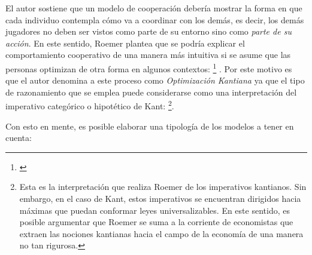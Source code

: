 El autor sostiene que un modelo de cooperación debería mostrar la forma en que cada individuo contempla cómo va a coordinar con los demás, es decir, los demás jugadores no deben ser vistos como parte de su entorno sino como \textit{parte de su acción}. En este sentido, Roemer plantea que se podría explicar el comportamiento cooperativo de una manera más intuitiva si se asume que las personas optimizan de otra forma en algunos contextos: \footnote{ \citep[p. viii]{Roemer_2019}} \citep[p. viii]{Roemer_2019}. Por este motivo es que el autor denomina a este proceso como \textit{Optimización Kantiana} ya que el tipo de razonamiento que se emplea puede considerarse como una interpretación del imperativo categórico o hipotético de Kant: \footnote{Esta es la interpretación que realiza Roemer de los imperativos kantianos. Sin embargo, en el caso de Kant, estos imperativos se encuentran dirigidos hacia máximas que puedan conformar leyes universalizables. En este sentido, es posible argumentar que Roemer se suma a la corriente de economistas que extraen las nociones kantianas hacia el campo de la economía de una manera no tan rigurosa.}. 

Con esto en mente, es posible elaborar una tipología de los modelos a tener en cuenta:



